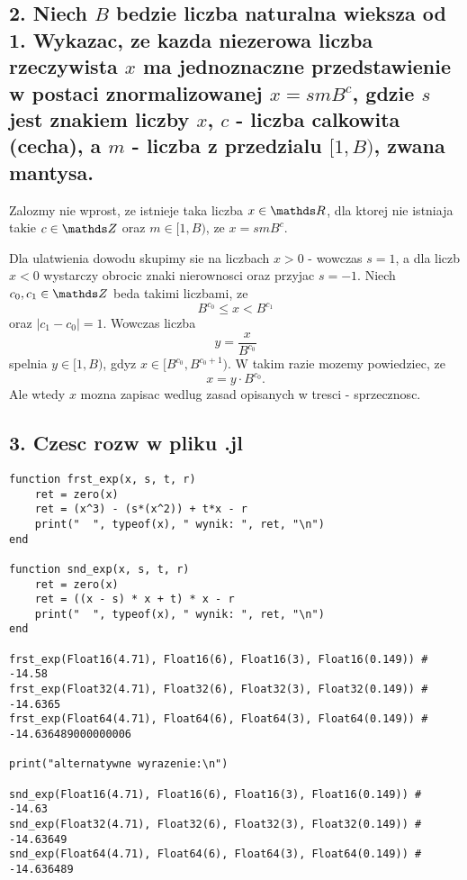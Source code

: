 \documentclass{article}[13pt]
\begin{document}
    \subsection*{2. Niech $B$ bedzie liczba naturalna wieksza od 1. Wykazac, ze kazda niezerowa liczba rzeczywista $x$ ma jednoznaczne przedstawienie w postaci znormalizowanej $x=smB^c$, gdzie $s$ jest znakiem liczby $x$, $c$ - liczba calkowita (cecha), a $m$ - liczba z przedzialu $[1, B)$, zwana mantysa.}

    Zalozmy nie wprost, ze istnieje taka liczba $x\in\R$, dla ktorej nie istniaja takie $c\in\Z$ oraz $m\in[1, B)$, ze $x=smB^c$.
    \smallskip

    Dla ulatwienia dowodu skupimy sie na liczbach $x>0$ - wowczas $s=1$, a dla liczb $x<0$ wystarczy obrocic znaki nierownosci oraz przyjac $s=-1$.
    Niech $c_0, c_1\in\Z$ beda takimi liczbami, ze 
    $$B^{c_0}\leq x< B^{c_1}$$
    oraz $|c_1-c_0|=1$. Wowczas liczba 
    $$y=\frac{x}{B^{c_0}}$$
    spelnia $y\in [1, B)$, gdyz $x\in [B^{c_0}, B^{c_0+1})$. W takim razie mozemy powiedziec, ze
    $$x=y\cdot B^{c_0}.$$
    Ale wtedy $x$ mozna zapisac wedlug zasad opisanych w tresci - sprzecznosc.

    \kdowod

    \subsection{3. Czesc rozw w pliku .jl}

    \begin{lstlisting}[language=juleczka]
function frst_exp(x, s, t, r)
    ret = zero(x)
    ret = (x^3) - (s*(x^2)) + t*x - r
    print("  ", typeof(x), " wynik: ", ret, "\n")
end

function snd_exp(x, s, t, r)
    ret = zero(x)
    ret = ((x - s) * x + t) * x - r
    print("  ", typeof(x), " wynik: ", ret, "\n")
end

frst_exp(Float16(4.71), Float16(6), Float16(3), Float16(0.149)) # -14.58
frst_exp(Float32(4.71), Float32(6), Float32(3), Float32(0.149)) # -14.6365
frst_exp(Float64(4.71), Float64(6), Float64(3), Float64(0.149)) # -14.636489000000006

print("alternatywne wyrazenie:\n")

snd_exp(Float16(4.71), Float16(6), Float16(3), Float16(0.149)) # -14.63
snd_exp(Float32(4.71), Float32(6), Float32(3), Float32(0.149)) # -14.63649
snd_exp(Float64(4.71), Float64(6), Float64(3), Float64(0.149)) # -14.636489
    \end{lstlisting}
\end{document}
